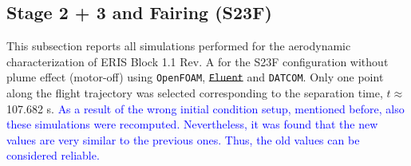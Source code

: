 \documentclass[12pt]{article}
\begin{document}
\subsection{Stage 2 + 3 and Fairing (S23F)}\label{subsec:results_S23F}
This subsection reports all simulations performed for the aerodynamic characterization of ERIS Block 1.1 Rev. A for the S23F configuration without plume effect (motor-off) using \texttt{OpenFOAM}, \texttt{\st{Fluent}} and \texttt{DATCOM}. Only one point along the flight trajectory was selected corresponding to the separation time, $t \approx$ 107.682 s. \textcolor{blue}{As a result of the wrong initial condition setup, mentioned before, also these simulations were recomputed. Nevertheless, it was found that the new values are very similar to the previous ones. Thus, the old values can be considered reliable.}
\end{document}
